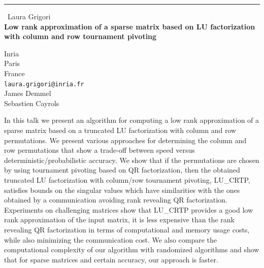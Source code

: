 \documentclass{report}
\begin{document}
\begin{center}
\rule{6in}{1pt} \
{\large Laura Grigori \\
{\bf Low rank approximation of a sparse matrix based on LU factorization with column and row tournament pivoting }}

Inria \\ Paris \\ France
\\
{\tt laura.grigori@inria.fr}\\
James Demmel\\
Sebastien Cayrols\end{center}

In this talk we present an algorithm for computing a low rank
approximation of a sparse matrix based on a truncated LU factorization
with column and row permutations. We present various approaches for
determining the column and row permutations that show a trade-off between
speed versus deterministic/probabilistic accuracy. We show that if the
permutations are chosen by using tournament pivoting based on QR
factorization, then the obtained truncated LU factorization with
column/row tournament pivoting, LU\_CRTP, satisfies bounds on the
singular values which have similarities with the ones obtained by a
communication avoiding rank revealing QR factorization. Experiments on
challenging matrices show that LU\_CRTP provides a good low rank
approximation of the input matrix, it is less expensive than the rank
revealing QR factorization in terms of computational and memory usage
costs, while also minimizing the communication cost. We also compare the
computational complexity of our algorithm with randomized algorithms and
show that for sparse matrices and certain accuracy, our approach is
faster.
\end{document}
